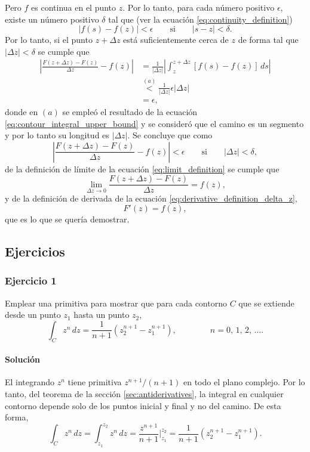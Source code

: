 \documentclass[a4paper]{report}
\begin{document}
Pero \(f\) es continua en el punto \(z\). Por lo tanto, para cada número positivo \(\epsilon\), existe un número positivo \(\delta\) tal que (ver la ecuación \ref{eq:continuity_definition})
\[
 |f(s)-f(z)|<\epsilon\qquad\textrm{si}\qquad|s-z|<\delta. 
\]
Por lo tanto, si el punto \(z+\Delta z\) está suficientemente cerca de \(z\) de forma tal que \(|\Delta z|<\delta\) se cumple que
\begin{align*}
 \left|\frac{F(z+\Delta z)-F(z)}{\Delta z}-f(z)\right|&=\frac{1}{|\Delta z|}\left|\int_{z}^{z+\Delta z}[f(s)-f(z)]\,ds\right|\\ 
 &\overset{(a)}{<}\frac{1}{|\Delta z|}\epsilon|\Delta z|\\
 &=\epsilon,
\end{align*}
donde en \((a)\) se empleó el resultado de la ecuación \ref{eq:contour_integral_upper_bound} y se consideró que el camino es un segmento y por lo tanto su longitud es \(|\Delta z|\). Se concluye que como 
\[
 \left|\frac{F(z+\Delta z)-F(z)}{\Delta z}-f(z)\right|<\epsilon
 \qquad\textrm{si}\qquad|\Delta z|<\delta,
\]
de la definición de límite de la ecuación \ref{eq:limit_definition} se cumple que 
\[
 \lim_{\Delta z\to0}\frac{F(z+\Delta z)-F(z)}{\Delta z}=f(z),
\]
y de la definición de derivada de la ecuación \ref{eq:derivative_definition_delta_z},
\[
 F'(z)=f(z),
\]
que es lo que se quería demostrar.

\subsection*{Ejercicios}

\subsubsection*{Ejercicio 1}

Emplear una primitiva para mostrar que para cada contorno \(C\) que se extiende desde un punto \(z_1\) hasta un punto \(z_2\),
\[
 \int_Cz^n\,dz=\frac{1}{n+1}\left(z_2^{n+1}-z_1^{n+1}\right),
 \qquad\qquad
 n=0,\,1,\,2,\,\dots.
\]

\paragraph{Solución} El integrando \(z^n\) tiene primitiva \(z^{n+1}/(n+1)\) en todo el plano complejo. Por lo tanto, del teorema de la sección \ref{sec:antiderivatives}, la integral en cualquier contorno depende solo de los puntos inicial y final y no del camino. De esta forma,
\[
 \int_Cz^n\,dz=\int_{z_1}^{z_2}z^n\,dz=\frac{z^{n+1}}{n+1}\bigg|_{z_1}^{z_2}=\frac{1}{n+1}\left(z_2^{n+1}-z_1^{n+1}\right).
\]
\end{document}
